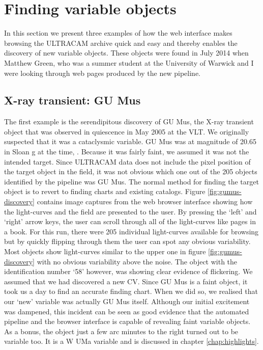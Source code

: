 \section{Finding variable objects}
In this section we present three examples of how the web interface makes browsing the ULTRACAM archive quick and easy and thereby enables the discovery of new variable objects. These objects were found in July 2014 when Matthew Green, who was a summer student at the University of Warwick and I were looking through web pages produced by the new pipeline.

\subsection{X-ray transient: GU Mus}
The first example is the serendipitous discovery of {GU Mus}, the X-ray transient object that was observed in quiescence in May 2005 at the VLT. We originally suspected that it was a cataclysmic variable. {GU Mus} was at magnitude of 20.65 in Sloan g at the time, \citep{tariq2010}. Because it was fairly faint, we assumed it was not the intended target. Since ULTRACAM data does not include the pixel position of the target object in the field, it was not obvious which one out of the 205 objects identified by the pipeline was {GU Mus}. The normal method for finding the target object is to revert to finding charts and existing catalogs. Figure \ref{fig:gumus-discovery} contains image captures from the web browser interface showing how the light-curves and the field are presented to the user. By pressing the `left' and `right' arrow keys, the user can scroll through all of the light-curves like pages in a book. For this run, there were 205 individual light-curves available for browsing but by quickly flipping through them the user can spot any obvious variability. Most objects show light-curves similar to the upper one in figure \ref{fig:gumus-discovery} with no obvious variability above the noise. The object with the identification number `58' however, was showing clear evidence of flickering. We assumed that we had discovered a new CV. Since {GU Mus} is a faint object, it took us a day to find an accurate finding chart. When we did so, we realised that our `new' variable was actually {GU Mus} itself. Although our initial excitement was dampened, this incident can be seen as good evidence that the automated pipeline and the browser interface is capable of revealing faint variable objects. As a bonus, the object just a few arc minutes to the right turned out to be variable too. It is a {W UMa} variable and is discussed in chapter \ref{chap:highlights}.

